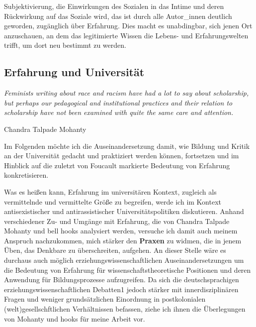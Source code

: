 Subjektivierung, die Einwirkungen
des Sozialen in das Intime und deren Rückwirkung auf das Soziale wird, das ist
durch alle Autor\_innen deutlich geworden, zugänglich über Erfahrung. Dies macht
es unabdingbar, sich jenen Ort anzuschauen, an dem das legitimierte Wissen die
Lebens- und Erfahrungswelten trifft, um dort neu bestimmt zu werden.

\subsection{Erfahrung und Universität}
\epigraph{\textit{
   Feminists writing about race and racism have had a lot to 
say about scholarship, but perhaps our pedagogical and institutional practices
and their relation to scholarship have not been examined with quite the same
care and attention.     
    }}{Chandra Talpade Mohanty \footnotemark}  

  Im Folgenden möchte ich die Auseinandersetzung damit, wie Bildung und Kritik
  an der Universität gedacht und praktiziert werden können, fortsetzen und im
  Hinblick auf die zuletzt von Foucault markierte Bedeutung von Erfahrung
  konkretisieren.  
  
  Was es heißen kann, Erfahrung im universitären Kontext,
  zugleich als vermittelnde und vermittelte Größe zu begreifen, werde ich im
  Kontext antisexistischer und antirassistischer Universitätspolitiken
  diskutieren. Anhand verschiedener Zu- und Umgänge mit Erfahrung, die von
  Chandra Talpade Mohanty und bell hooks analysiert werden, versuche ich damit
  auch meinem Anspruch nachzukommen, mich stärker den \textbf{Praxen} zu widmen, die in
  jenem Üben, das Denkbare zu überschreiten, aufgehen. An dieser Stelle wäre es
  durchaus auch möglich  erziehungswissenschaftlichen Auseinandersetzungen um
  die Bedeutung von Erfahrung für wissenschaftstheoretische Positionen und
  deren Anwendung für  Bildungsprozesse  aufzugreifen. Da sich die
  deutschsprachigen erziehungswissenschaftlichen Debatten1 jedoch stärker mit
  innerdisziplinären Fragen und weniger grundsätzlichen Einordnung in
  postkolonialen (welt)gesellschftlichen Verhältnissen befassen, ziehe ich
  ihnen die Überlegungen von  Mohanty und hooks für meine Arbeit vor.
